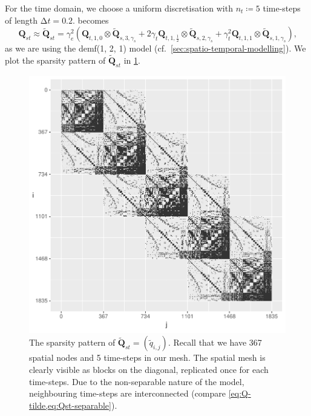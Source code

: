 \documentclass[british]{scrreprt}
\begin{document}
For the time domain, we choose a uniform discretisation with \( n_{t} \coloneqq 5 \) time-steps of length \( \increment t = 0.2 \).  becomes
\begin{equation}
    \symbf{Q}_{st} \approx \symbf{\tilde{Q}}_{st} = \gamma_{e}^{2} \left(
                           \symbf{Q}_{t, 1, 0}           \otimes \symbf{\tilde{Q}}_{s, 3, \gamma_{s}}
        + 2 \gamma_{t}     \symbf{Q}_{t, 1, \frac{1}{2}} \otimes \symbf{\tilde{Q}}_{s, 2, \gamma_{s}}
        +   \gamma_{t}^{2} \symbf{Q}_{t, 1, 1}           \otimes \symbf{\tilde{Q}}_{s, 1, \gamma_{s}}
    \right)
    \label{eq:Q-tilde}
    \text{,}
\end{equation}
as we are using the \gls{demf}(1, 2, 1) model (cf.\ \cref{sec:spatio-temporal-modelling}). We plot the sparsity pattern of \( \symbf{\tilde{Q}}_{st}\) in \cref{fig:Q-sparsity}.
\begin{figure}
    \includegraphics{img/Q_sparsity.pdf}
    \caption{The sparsity pattern of \( \symbf{\tilde{Q}}_{st} = (\tilde{q}_{i, j}) \). Recall that we have 367 spatial nodes and 5 time-steps in our mesh. The spatial mesh is clearly visible as blocks on the diagonal, replicated once for each time-steps. Due to the non-separable nature of the model, neighbouring time-steps are interconnected (compare \cref{eq:Q-tilde,eq:Qst-separable}).}
    \label{fig:Q-sparsity}
\end{figure}
\end{document}
